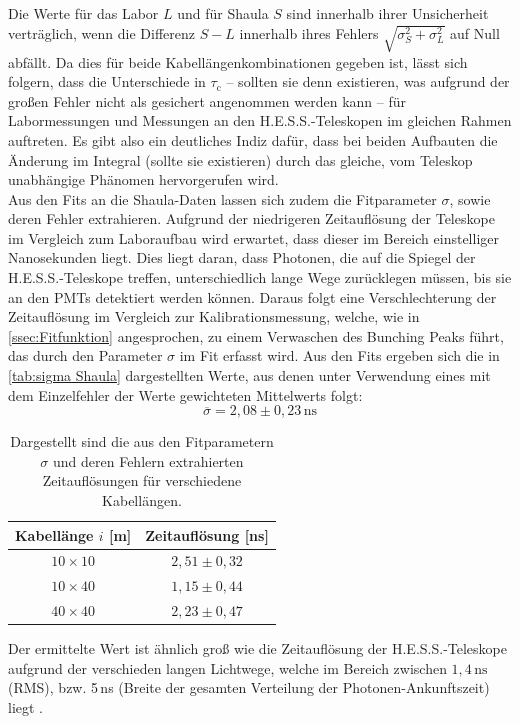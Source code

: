 Die Werte für das Labor $L$ und für Shaula $S$ sind innerhalb ihrer Unsicherheit verträglich, wenn die Differenz $S-L$ innerhalb ihres Fehlers $\sqrt{\sigma_S^2 + \sigma_L^2}$ auf Null abfällt. 
Da dies für beide Kabellängenkombinationen gegeben ist, lässt sich folgern, dass die Unterschiede in $\tau_{\mathrm{c}}$ -- sollten sie denn existieren, was aufgrund der großen Fehler nicht als gesichert angenommen werden kann -- für Labormessungen und Messungen an den H.E.S.S.-Teleskopen im  gleichen Rahmen auftreten. 
Es gibt also ein deutliches Indiz dafür, dass bei beiden Aufbauten die Änderung im Integral (sollte sie existieren) durch das gleiche, vom Teleskop unabhängige Phänomen hervorgerufen wird. \\

Aus den Fits an die Shaula-Daten lassen sich zudem die Fitparameter $\sigma$, sowie deren Fehler extrahieren. 
Aufgrund der niedrigeren Zeitauflösung der Teleskope im Vergleich zum Laboraufbau wird erwartet, dass dieser im Bereich einstelliger Nanosekunden liegt. 
Dies liegt daran, dass Photonen, die auf die Spiegel der H.E.S.S.-Teleskope treffen, unterschiedlich lange Wege zurücklegen müssen, bis sie an den PMTs detektiert werden können. 
Daraus folgt eine Verschlechterung der Zeitauflösung im Vergleich zur Kalibrationsmessung, welche, wie in \autoref{ssec:Fitfunktion} angesprochen, zu einem Verwaschen des Bunching Peaks führt, das durch den Parameter $\sigma$ im Fit erfasst wird. 
Aus den Fits ergeben sich die in \autoref{tab:sigma Shaula} dargestellten Werte, aus denen unter Verwendung eines mit dem Einzelfehler der Werte gewichteten Mittelwerts folgt: 
\begin{equation}
    \overline{\sigma} = 2{,}08 \pm 0{,}23\,\mathrm{ns}
\end{equation}
\begin{table}[h]
    \centering
    \begin{tabular}{|c|c|}\hline
        Kabellänge $i$ [m] & Zeitauflösung [ns]  \\\hline
        $10\times 10$      & $2{,}51 \pm 0{,}32$ \\\hline
        $10\times 40$      & $1{,}15 \pm 0{,}44$ \\\hline
        $40\times 40$      & $2{,}23 \pm 0{,}47$ \\\hline
    \end{tabular}
    \caption{Dargestellt sind die aus den Fitparametern $\sigma$ und deren Fehlern extrahierten Zeitauflösungen für verschiedene Kabellängen.}
    \label{tab:sigma Shaula}
\end{table}
Der ermittelte Wert ist ähnlich groß wie die Zeitauflösung der H.E.S.S.-Teleskope aufgrund der verschieden langen Lichtwege, welche im Bereich zwischen $1{,}4\,\mathrm{ns}$ (RMS), bzw. 5\,ns (Breite der gesamten Verteilung der Photonen-Ankunftszeit) liegt \cite{bernlohrOpticalSystemImaging2003}. 